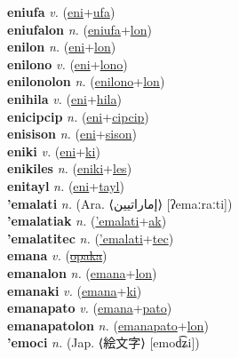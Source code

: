\textbf{eniufa} \textit{v.} (\hyperref[eni]{eni}+\hyperref[ufa]{ufa})
 \label{eniufa} \\
\textbf{eniufalon} \textit{n.} (\hyperref[eniufa]{eniufa}+\hyperref[lon]{lon})
 \label{eniufalon} \\
\textbf{enilon} \textit{n.} (\hyperref[eni]{eni}+\hyperref[lon]{lon})
 \label{enilon} \\
\textbf{enilono} \textit{v.} (\hyperref[eni]{eni}+\hyperref[lono]{lono})
 \label{enilono} \\
\textbf{enilonolon} \textit{n.} (\hyperref[enilono]{enilono}+\hyperref[lon]{lon})
 \label{enilonolon} \\
\textbf{enihila} \textit{v.} (\hyperref[eni]{eni}+\hyperref[hila]{hila})
 \label{enihila} \\
\textbf{enicipcip} \textit{n.} (\hyperref[eni]{eni}+\hyperref[cipcip]{cipcip})
 \label{enicipcip} \\
\textbf{enisison} \textit{n.} (\hyperref[eni]{eni}+\hyperref[sison]{sison})
 \label{enisison} \\
\textbf{eniki} \textit{v.} (\hyperref[eni]{eni}+\hyperref[ki]{ki})
 \label{eniki} \\
\textbf{enikiles} \textit{n.} (\hyperref[eniki]{eniki}+\hyperref[les]{les})
 \label{enikiles} \\
\textbf{enitayl} \textit{n.} (\hyperref[eni]{eni}+\hyperref[tayl]{tayl})
 \label{enitayl} \\
\textbf{'emalati} \textit{n.} (Ara. ⟨إماراتيين‎⟩ [ʔemaːraːti])
 \label{'emalati} \\
\textbf{'emalatiak} \textit{n.} (\hyperref['emalati]{'emalati}+\hyperref[ak]{ak})
 \label{'emalatiak} \\
\textbf{'emalatitec} \textit{n.} (\hyperref['emalati]{'emalati}+\hyperref[tec]{tec})
 \label{'emalatitec} \\
\textbf{emana} \textit{v.} (\hyperref[opaka]{\sout{opaka}})
 \label{emana} \\
\textbf{emanalon} \textit{n.} (\hyperref[emana]{emana}+\hyperref[lon]{lon})
 \label{emanalon} \\
\textbf{emanaki} \textit{v.} (\hyperref[emana]{emana}+\hyperref[ki]{ki})
 \label{emanaki} \\
\textbf{emanapato} \textit{v.} (\hyperref[emana]{emana}+\hyperref[pato]{pato})
 \label{emanapato} \\
\textbf{emanapatolon} \textit{n.} (\hyperref[emanapato]{emanapato}+\hyperref[lon]{lon})
 \label{emanapatolon} \\
\textbf{'emoci} \textit{n.} (Jap. ⟨絵文字⟩ [emod͡ʑi])
